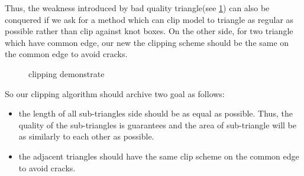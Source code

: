 \documentclass[3p]{elsarticle}
\begin{document}
Thus, the weakness introduced by bad quality triangle(see \ref{fig:clip_quality}) can also be conquered if we ask for a method which can clip model to triangle as regular as possible rather than clip against knot boxes. On the other side, for two triangle which have common edge, our new the clipping scheme should be the same on the common edge to avoid cracks.

\begin{figure}
  \centering
  \hfill
  \hfill
  \caption{clipping demonstrate}
  \label{fig:clip_quality}
\end{figure}

So our clipping algorithm should archive two goal as follows:
\begin{itemize}
    \item the length of all sub-triangles side should be as equal as possible. Thus, the quality of the sub-triangles is guarantees and the area of sub-triangle will be as similarly to each other as possible.
    \item the adjacent triangles should have the same clip scheme on the common edge to avoid cracks.
\end{itemize}
\end{document}
